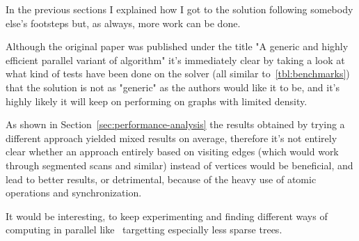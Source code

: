 \documentclass[a4paper,10pt]{article}
\begin{document}
In the previous sections I explained how I got to the solution following somebody else's footsteps but, as always, more work can be done.

Although the original paper was published under the title "A generic and highly efficient parallel variant of \brkas algorithm" it's immediately clear by taking a look at what kind of tests have been done on the solver (all similar to~\ref{tbl:benchmarks}) that the solution is not as "generic" as the authors would like it to be, and it's highly likely it will keep on performing on graphs with limited density.

As shown in Section~\ref{sec:performance-analysis} the results obtained by trying a different approach yielded mixed results on average, therefore it's not entirely clear whether an approach entirely based on visiting edges (which would work through segmented scans and similar) instead of vertices would be beneficial, and lead to better results, or detrimental, because of the heavy use of atomic operations and synchronization.

It would be interesting, to keep experimenting and finding different ways of computing \mst in parallel like~\cite{mst-bipartite} targetting especially less sparse trees.

\clearpage

\printbibliography
\end{document}
